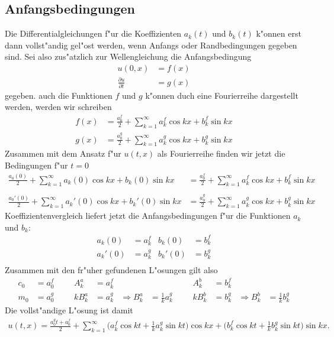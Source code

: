 \subsection{Anfangsbedingungen}
Die Differentialgleichungen f"ur die Koeffizienten $a_k(t)$ und $b_k(t)$
k"onnen erst dann vollst"andig gel"ost werden, wenn Anfangs oder Randbedingungen
gegeben sind. Sei also zus"atzlich zur Wellengleichung die Anfangsbedingung
\begin{align*}
u(0,x)&=f(x)\\
\frac{\partial u}{\partial t}&=g(x)
\end{align*}
gegeben. auch die Funktionen $f$ und $g$ k"onnen duch eine Fourierreihe
dargestellt werden, werden wir schreiben
\begin{align*}
f(x)&=\frac{a_0^f}2+\sum_{k=1}^\infty a_k^f\cos kx+b_k^f\sin kx\\
g(x)&=\frac{a_0^g}2+\sum_{k=1}^\infty a_k^g\cos kx+b_k^g\sin kx
\end{align*}
Zusammen mit dem Ansatz f"ur $u(t,x)$ als Fourierreihe finden wir jetzt
die Bedingungen f"ur $t=0$
\begin{align*}
\frac{a_0(0)}2+\sum_{k=1}^\infty a_k(0)\cos kx +b_k(0)\sin kx
&=
\frac{a_0^f}2+\sum_{k=1}^\infty a_k^f\cos kx+b_k^f\sin kx\\
\\
\frac{a_0'(0)}2+\sum_{k=1}^\infty a_k'(0)\cos kx+b_k'(0)\sin kx
&=
\frac{a_0^g}2+\sum_{k=1}^\infty a_k^g\cos kx+b_k^g\sin kx
\end{align*}
Koeffizientenvergleich liefert jetzt die Anfangsbedingungen f"ur die
Funktionen $a_k$ und $b_k$:
\begin{align*}
a_k(0)&=a_k^f&b_k(0)&=b_k^f\\
a_k'(0)&=a_k^g&b_k'(0)&=b_k^g\\
\end{align*}
Zusammen mit den fr"uher gefundenen L"osungen gilt also
\begin{align*}
c_0&=a_0^f&&&A_k^a&=a_k^f&&&&&A_k^b&=b_k^f\\
m_0&=a_0^g&&&kB_k^a&=a_k^g&\Rightarrow B_k^a&=\frac1ka_k^g&&&kB_k^b&=b_k^g&\Rightarrow B_k^b&=\frac1kb_k^g
\end{align*}
Die vollst"andige L"osung ist damit
\begin{align*}
u(t,x)=\frac{a_0^gt+a_0^f}2
+\sum_{k=1}^\infty
\biggl(a_k^f\cos kt+\frac1ka_k^g\sin kt\biggr)\cos kx
+
\biggl(b_k^f\cos kt+\frac1kb_k^g\sin kt\biggr)\sin kx.
\end{align*}

